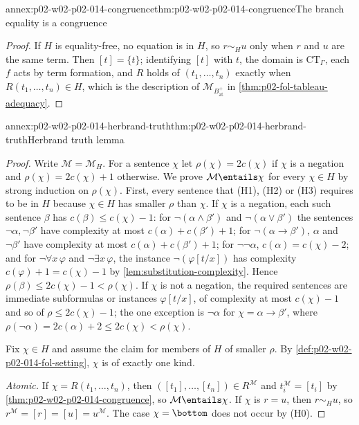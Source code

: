 \begin{annexitem}{annex:p02-w02-p02-014-congruence}{thm:p02-w02-p02-014-congruence}{The branch equality is a congruence}
\begin{proof}
If \(H\) is equality-free, no equation is in \(H\), so \(r\sim_H u\) only when
\(r\) and \(u\) are the same term.  Then \([t]=\{t\}\); identifying \([t]\)
with \(t\), the domain is \(\mathrm{CT}_{\Gamma}\), each \(f\) acts by term
formation, and \(R\) holds of \((t_1,\ldots,t_n)\) exactly when
\(R(t_1,\ldots,t_n)\in H\), which is the description of
\(\mathcal M_{B^{+}_{\mathrm{at}}}\) in \cref{thm:p02-fol-tableau-adequacy}.
\end{proof}
\end{annexitem}

\begin{annexitem}{annex:p02-w02-p02-014-herbrand-truth}{thm:p02-w02-p02-014-herbrand-truth}{Herbrand truth lemma}
\begin{proof}
Write \(\mathcal M=\mathcal M_H\).  For a sentence \(\chi\) let
\(\rho(\chi)=2c(\chi)\) if \(\chi\) is a negation and
\(\rho(\chi)=2c(\chi)+1\) otherwise.  We prove \(\mathcal M\entails\chi\) for
every \(\chi\in H\) by strong induction on \(\rho(\chi)\).  First, every
sentence that (H1), (H2) or (H3) requires to be in \(H\) because
\(\chi\in H\) has smaller \(\rho\) than \(\chi\).  If \(\chi\) is a negation,
each such sentence \(\beta\) has \(c(\beta)\leq c(\chi)-1\): for
\(\neg(\alpha\land\beta')\) and \(\neg(\alpha\lor\beta')\) the sentences
\(\neg\alpha,\neg\beta'\) have complexity at most
\(c(\alpha)+c(\beta')+1\); for \(\neg(\alpha\to\beta')\), \(\alpha\) and
\(\neg\beta'\) have complexity at most \(c(\alpha)+c(\beta')+1\); for
\(\neg\neg\alpha\), \(c(\alpha)=c(\chi)-2\); and for
\(\neg\forall x\,\varphi\) and \(\neg\exists x\,\varphi\), the instance
\(\neg(\varphi[t/x])\) has complexity \(c(\varphi)+1=c(\chi)-1\) by
\cref{lem:substitution-complexity}.  Hence
\(\rho(\beta)\leq2c(\chi)-1<\rho(\chi)\).  If \(\chi\) is not a negation, the
required sentences are immediate subformulas or instances
\(\varphi[t/x]\), of complexity at most \(c(\chi)-1\) and so of
\(\rho\leq2c(\chi)-1\); the one exception is \(\neg\alpha\) for
\(\chi=\alpha\to\beta'\), where \(\rho(\neg\alpha)=2c(\alpha)+2\leq
2c(\chi)<\rho(\chi)\).

Fix \(\chi\in H\) and assume the claim for members of \(H\) of smaller
\(\rho\).  By \cref{def:p02-w02-p02-014-fol-setting}, \(\chi\) is of exactly
one kind.

\emph{Atomic.}  If \(\chi=R(t_1,\ldots,t_n)\), then
\(([t_1],\ldots,[t_n])\in R^{\mathcal M}\) and
\(t_i^{\mathcal M}=[t_i]\) by \cref{thm:p02-w02-p02-014-congruence}, so
\(\mathcal M\entails\chi\).  If \(\chi\) is \(r=u\), then \(r\sim_H u\), so
\(r^{\mathcal M}=[r]=[u]=u^{\mathcal M}\).  The case \(\chi=\bottom\) does not
occur by (H0).


\end{proof}
\end{annexitem}
